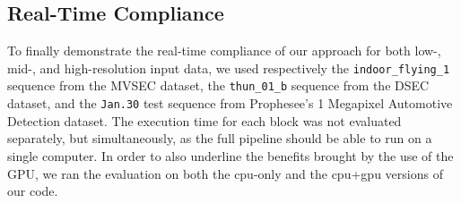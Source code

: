 \subsection{Real-Time Compliance}\label{sec:ebof:realtime}
To finally demonstrate the real-time compliance of our approach for both low-, mid-, and high-resolution input data, we used respectively the \verb|indoor_flying_1| sequence from the MVSEC dataset, the \verb|thun_01_b| sequence from the DSEC dataset, and the \verb|Jan.30| test sequence from Prophesee's 1 Megapixel Automotive Detection dataset. The execution time for each block was not evaluated separately, but simultaneously, as the full pipeline should be able to run on a single computer. In order to also underline the benefits brought by the use of the GPU, we ran the evaluation on both the \acrshort{cpu}-only and the \acrshort{cpu}+\acrshort{gpu} versions of our code.

